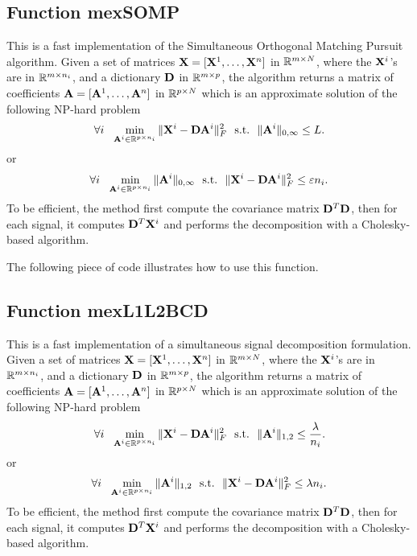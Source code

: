 \documentclass[a4paper, 11pt]{article}
\begin{document}
\subsection{Function mexSOMP}
This is a fast implementation of the Simultaneous Orthogonal Matching Pursuit algorithm. Given a set of matrices ${\mathbf X}=[{\mathbf X}^1,\ldots,{\mathbf X}^n]$  in ${\mathbb R}^{m \times N}$, where the ${\mathbf X}^i$'s are in ${\mathbb R}^{m \times n_i}$, and a dictionary ${\mathbf D}$ in ${\mathbb R}^{m \times p}$, the algorithm returns a matrix of coefficients ${\mathbf A}=[{\mathbf A}^1,\ldots,{\mathbf A}^n]$ in ${\mathbb R}^{p \times N}$ which is an approximate solution of the following NP-hard problem
\begin{equation}
\forall i~~ \min_{{\mathbf A}^i \in {\mathbb R}^{p \times n_i}} \|{\mathbf X}^i-{\mathbf D}{\mathbf A}^i\|_F^2 ~~\text{s.t.}~~ \|{\mathbf A}^i\|_{0,\infty} \leq L.
\end{equation}
or 
\begin{equation}
\forall i~~ \min_{{\mathbf A}^i \in {\mathbb R}^{p \times n_i}}  \|{\mathbf A}^i\|_{0,\infty} ~~\text{s.t.}~~ \|{\mathbf X}^i-{\mathbf D}{\mathbf A}^i\|_F^2 \leq \varepsilon n_i.
\end{equation}
To be efficient, the method first compute the covariance matrix ${\mathbf D}^T{\mathbf D}$, then for each signal, it computes ${\mathbf D}^T{\mathbf X}^i$ and performs the decomposition with a Cholesky-based algorithm.

%    

The following piece of code illustrates how to use this function.


\subsection{Function mexL1L2BCD}
This is a fast implementation of a simultaneous signal decomposition formulation. Given a set of matrices ${\mathbf X}=[{\mathbf X}^1,\ldots,{\mathbf X}^n]$  in ${\mathbb R}^{m \times N}$, where the ${\mathbf X}^i$'s are in ${\mathbb R}^{m \times n_i}$, and a dictionary ${\mathbf D}$ in ${\mathbb R}^{m \times p}$, the algorithm returns a matrix of coefficients ${\mathbf A}=[{\mathbf A}^1,\ldots,{\mathbf A}^n]$ in ${\mathbb R}^{p \times N}$ which is an approximate solution of the following NP-hard problem
\begin{equation}
\forall i~~ \min_{{\mathbf A}^i \in {\mathbb R}^{p \times n_i}} \|{\mathbf X}^i-{\mathbf D}{\mathbf A}^i\|_F^2 ~~\text{s.t.}~~ \|{\mathbf A}^i\|_{1,2} \leq \frac{\lambda}{n_i}.
\end{equation}
or 
\begin{equation}
\forall i~~ \min_{{\mathbf A}^i \in {\mathbb R}^{p \times n_i}}  \|{\mathbf A}^i\|_{1,2} ~~\text{s.t.}~~ \|{\mathbf X}^i-{\mathbf D}{\mathbf A}^i\|_F^2 \leq \lambda n_i.
\end{equation}
To be efficient, the method first compute the covariance matrix ${\mathbf D}^T{\mathbf D}$, then for each signal, it computes ${\mathbf D}^T{\mathbf X}^i$ and performs the decomposition with a Cholesky-based algorithm.
\end{document}
